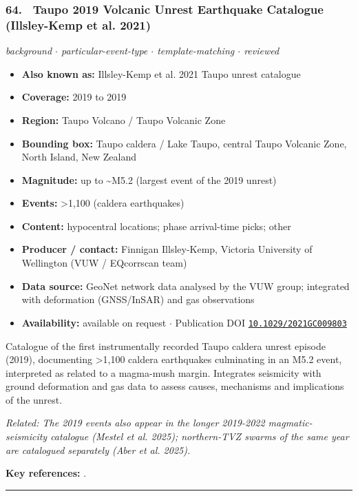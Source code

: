 \documentclass[10pt,a4paper]{article}
\newcommand{\catentryrule}{\par\vspace{3pt}\noindent\textcolor{rulegrey}{\rule{\linewidth}{0.3pt}}\par\vspace{5pt}}
\newcommand{\kv}[2]{\item \textbf{#1:} #2}
\begin{document}
\subsubsection*{\hypertarget{c:64}{64.}~ Taupo 2019 Volcanic Unrest Earthquake Catalogue (Illsley-Kemp et al. 2021)}
{\small\itshape background $\cdot$ particular-event-type $\cdot$ template-matching $\cdot$ reviewed}\par\vspace{2pt}
\begin{itemize}[leftmargin=1.3em,itemsep=0.6pt,topsep=1pt,parsep=0pt]
\kv{Also known as}{Illsley-Kemp et al. 2021 Taupo unrest catalogue}
\kv{Coverage}{2019 to 2019}
\kv{Region}{Taupo Volcano / Taupo Volcanic Zone}
\kv{Bounding box}{Taupo caldera / Lake Taupo, central Taupo Volcanic Zone, North Island, New Zealand}
\kv{Magnitude}{up to \textasciitilde{}M5.2 (largest event of the 2019 unrest)}
\kv{Events}{\textgreater{}1,100 (caldera earthquakes)}
\kv{Content}{hypocentral locations; phase arrival-time picks; other}
\kv{Producer / contact}{Finnigan Illsley-Kemp, Victoria University of Wellington (VUW / EQcorrscan team)}
\kv{Data source}{GeoNet network data analysed by the VUW group; integrated with deformation (GNSS/InSAR) and gas observations}
\kv{Availability}{available on request $\cdot$ Publication DOI \href{https://doi.org/10.1029/2021GC009803}{\nolinkurl{10.1029/2021GC009803}}}
\end{itemize}
\par\vspace{2pt}Catalogue of the first instrumentally recorded Taupo caldera unrest episode (2019), documenting \textgreater{}1,100 caldera earthquakes culminating in an M5.2 event, interpreted as related to a magma-mush margin. Integrates seismicity with ground deformation and gas data to assess causes, mechanisms and implications of the unrest.
\par{\small\itshape Related: The 2019 events also appear in the longer 2019-2022 magmatic-seismicity catalogue (Mestel et al. 2025); northern-TVZ swarms of the same year are catalogued separately (Aber et al. 2025).}
\par\vspace{2pt}\textbf{Key references:} \cite{IllsleyKemp2021}.
\catentryrule
\end{document}
